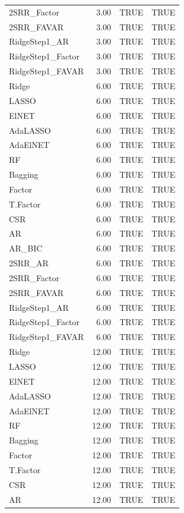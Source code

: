 \begin{table}[ht]
\begin{tabular}{lrll}
  2SRR\_Factor & 3.00 & TRUE & TRUE \\ 
  2SRR\_FAVAR & 3.00 & TRUE & TRUE \\ 
  RidgeStep1\_AR & 3.00 & TRUE & TRUE \\ 
  RidgeStep1\_Factor & 3.00 & TRUE & TRUE \\ 
  RidgeStep1\_FAVAR & 3.00 & TRUE & TRUE \\ 
  Ridge & 6.00 & TRUE & TRUE \\ 
  LASSO & 6.00 & TRUE & TRUE \\ 
  ElNET & 6.00 & TRUE & TRUE \\ 
  AdaLASSO & 6.00 & TRUE & TRUE \\ 
  AdaElNET & 6.00 & TRUE & TRUE \\ 
  RF & 6.00 & TRUE & TRUE \\ 
  Bagging & 6.00 & TRUE & TRUE \\ 
  Factor & 6.00 & TRUE & TRUE \\ 
  T.Factor & 6.00 & TRUE & TRUE \\ 
  CSR & 6.00 & TRUE & TRUE \\ 
  AR & 6.00 & TRUE & TRUE \\ 
  AR\_BIC & 6.00 & TRUE & TRUE \\ 
  2SRR\_AR & 6.00 & TRUE & TRUE \\ 
  2SRR\_Factor & 6.00 & TRUE & TRUE \\ 
  2SRR\_FAVAR & 6.00 & TRUE & TRUE \\ 
  RidgeStep1\_AR & 6.00 & TRUE & TRUE \\ 
  RidgeStep1\_Factor & 6.00 & TRUE & TRUE \\ 
  RidgeStep1\_FAVAR & 6.00 & TRUE & TRUE \\ 
  Ridge & 12.00 & TRUE & TRUE \\ 
  LASSO & 12.00 & TRUE & TRUE \\ 
  ElNET & 12.00 & TRUE & TRUE \\ 
  AdaLASSO & 12.00 & TRUE & TRUE \\ 
  AdaElNET & 12.00 & TRUE & TRUE \\ 
  RF & 12.00 & TRUE & TRUE \\ 
  Bagging & 12.00 & TRUE & TRUE \\ 
  Factor & 12.00 & TRUE & TRUE \\ 
  T.Factor & 12.00 & TRUE & TRUE \\ 
  CSR & 12.00 & TRUE & TRUE \\ 
  AR & 12.00 & TRUE & TRUE \\ 

\end{tabular}
\end{table}
